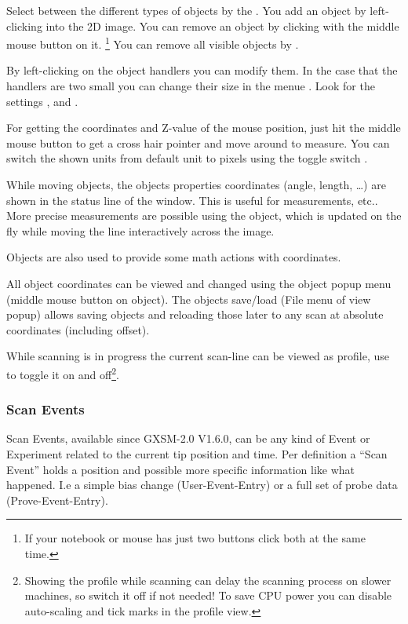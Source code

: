 Select between the different types of objects by the . You add an object by left-clicking into the 2D image. You can remove an object by clicking with the middle mouse button on it. \footnote{If your notebook or mouse has just two buttons click both at the same time.} You can remove all visible objects by .

By left-clicking on the object handlers you can modify them. In the case that the handlers are two small you can change their size in the menue . Look for the settings ,  and .

For getting the coordinates and Z-value of the mouse position, just
hit the middle mouse button to get a cross hair pointer and move
around to measure. You can switch the shown units from default unit to
pixels using the toggle switch .

While moving objects, the objects properties coordinates (angle,
length, \dots) are shown in the status line of the window. This is
useful for measurements, etc.. More precise measurements are possible
using the  object, which is updated on the fly
while moving the line interactively across the image.

Objects are also used to provide some math actions with coordinates.

All object coordinates can be viewed and changed using the object popup
menu (middle mouse button on object). The objects save/load (File menu
of view popup) allows saving objects and reloading those later to any
scan at absolute coordinates (including offset).

While scanning is in progress the current scan-line can be viewed as
profile, use  to
toggle it on and off\footnote{Showing the profile while scanning can
  delay the scanning process on slower machines, so switch it off if
  not needed! To save CPU power you can disable auto-scaling and
  tick marks in the profile view.}.

\subsubsection{Scan Events}
\label{Gxsm-Events}
Scan Events, available since GXSM-2.0 V1.6.0, can be any kind of Event
or Experiment related to the current tip position and time. Per
definition a \Gxsm ``Scan Event'' holds a position and possible more
specific information like what happened. I.e a simple bias change
(User-Event-Entry) or a full set of probe data (Prove-Event-Entry).

